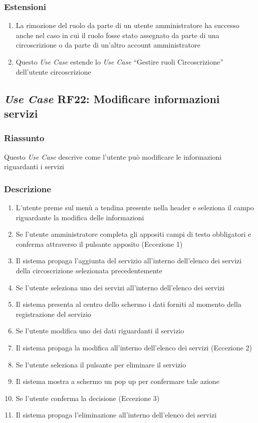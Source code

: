         \subsubsection{Estensioni}
            \begin{enumerate}
                \item La rimozione del ruolo da parte di un utente amministratore ha successo anche nel caso in cui il ruolo fosse stato assegnato da parte di una circoscrizione o da parte di un'altro account amministratore
                \item Questo \textit{Use Case} estende lo \textit{Use Case} ``Gestire ruoli Circoscrizione'' dell'utente circoscrizione
            \end{enumerate}

    \subsection{\textit{Use Case} RF22: Modificare informazioni servizi}
        \subsubsection{Riassunto}
        Questo \textit{Use Case} descrive come l'utente può modificare le informazioni riguardanti i servizi
        \subsubsection{Descrizione}
            \begin{enumerate}
                \item L'utente preme sul menù a tendina presente nella header e seleziona il campo riguardante la modifica delle informazioni
                \item Se l'utente amministratore completa gli appositi campi di testo obbligatori e conferma attraverso il pulsante apposito (Eccezione 1)
                \item Il sistema propaga l'aggiunta del servizio all'interno dell'elenco dei servizi della circoscrizione selezionata precedentemente
                \item Se l'utente seleziona uno dei servizi all'interno dell'elenco dei servizi
                \item Il sistema presenta al centro dello schermo i dati forniti al momento della registrazione del servizio
                \item Se l'utente modifica uno dei dati riguardanti il servizio
                \item Il sistema propaga la modifica all'interno dell'elenco dei servizi (Eccezione 2)
                \item Se l'utente seleziona il pulsante per eliminare il servizio
                \item Il sistema mostra a schermo un pop up per confermare tale azione
                \item Se l'utente conferma la decisione (Eccezione 3)
                \item Il sistema propaga l'eliminazione all'interno dell'elenco dei servizi
            \end{enumerate}

